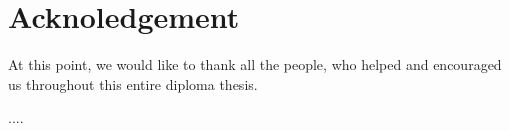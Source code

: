 \documentclass[12pt]{article}
\begin{document}
\makeatletter
\renewcommand\listoffigures{                                                                %
        \@starttoc{lof}
}
\renewcommand\listoftables{                                                                 %
        \@starttoc{lot}
}
\renewcommand\lstlistoflistings{                                                            %
        \@starttoc{lol}
}
\makeatother



\clearpage                                                                                  %
\thispagestyle{empty}
\hfill
\clearpage

\fancyhead{}
\clearpage



\section*{Acknoledgement} 
\fancyfoot[RO,LE]{\thepage}   
\setcounter{page}{1}



\par 
At this point, we would like to thank all the people, who helped and encouraged us throughout 
this entire diploma thesis. 

\par
....



\clearpage


\end{document}
